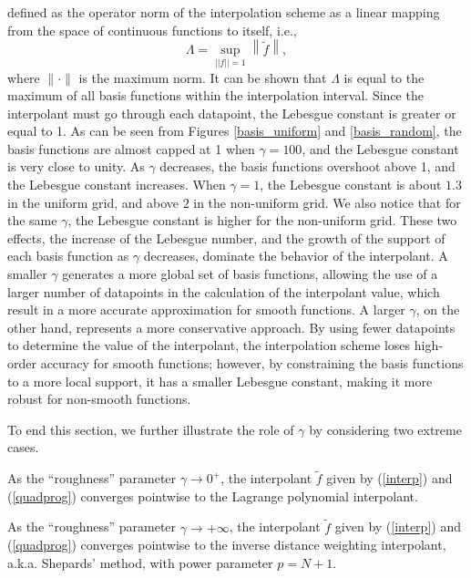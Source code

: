 defined as the operator norm of the interpolation scheme as a linear mapping
from the space of continuous functions to itself, i.e.,
\[ \Lambda = \sup_{||f|| = 1} \left\|{\tilde f}\right\| , \]
where $\|\cdot\|$ is the maximum norm.  It can be shown that $\Lambda$ is equal
to the maximum of all basis functions within the interpolation interval.
Since the interpolant must go through each datapoint, the Lebesgue constant
is greater or equal to 1.  As can be seen from Figures \ref{basis_uniform} and
\ref{basis_random},
the basis functions are almost capped at 1 when $\gamma=100$, and the
Lebesgue constant is very close to unity.  As $\gamma$ decreases, the basis
functions overshoot above 1, and the Lebesgue constant increases.
When $\gamma=1$, the Lebesgue constant is about $1.3$ in the uniform grid,
and above $2$ in the non-uniform grid.  We also notice that for the same
$\gamma$, the Lebesgue constant is higher for the non-uniform grid.
These two effects, the increase of the Lebesgue number, and the growth of the
support of each basis function as $\gamma$ decreases, dominate the behavior
of the interpolant.  A smaller $\gamma$ generates a more global set of basis
functions, allowing the use of a larger number of datapoints in the calculation
of the interpolant value, which result in a more accurate approximation for
smooth functions.  A larger $\gamma$, on the other hand, represents a more
conservative approach.  By using fewer datapoints to determine the value of
the interpolant, the interpolation scheme loses high-order accuracy for smooth
functions; however, by constraining the basis functions to a more local
support, it has a smaller Lebesgue constant, making it more robust for
non-smooth functions.

To end this section, we further illustrate the role of $\gamma$ by considering
two extreme cases.
\begin{proposition}
As the ``roughness'' parameter $\gamma \to 0^+$, the interpolant $\tilde f$
given by (\ref{interp}) and (\ref{quadprog}) converges pointwise to the
Lagrange polynomial interpolant.
\end{proposition}

\begin{proposition}
As the ``roughness'' parameter $\gamma \to +\infty$, the interpolant $\tilde f$
given by (\ref{interp}) and (\ref{quadprog}) converges pointwise to the
inverse distance weighting interpolant, a.k.a. Shepards' method,
with power parameter $p = N+1$.
\end{proposition}




